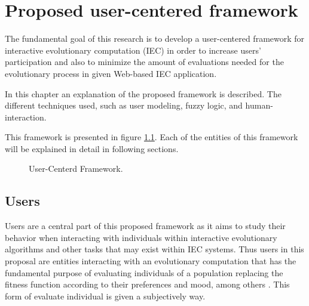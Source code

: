 \chapter{Proposed user-centered framework}

The fundamental goal of this research is to develop a user-centered framework
for interactive evolutionary computation (IEC) in order to increase users’
participation and also to minimize the amount of evaluations needed for the
evolutionary process in given Web-based IEC application.

In this chapter an explanation of the proposed framework is described. The
different techniques used, such as user modeling, fuzzy logic, and human-
interaction.

This framework is presented in figure \ref{fig:uc_framework}. Each of the
entities of this framework will be explained in detail in following sections.

\begin{figure}
	\captionsetup{justification=centering,margin=2cm}
	\centering
	\setlength\fboxsep{0pt}
	\setlength\fboxrule{0.7pt}
	\caption{User-Centerd Framework.}
	\label{fig:uc_framework}
\end{figure}

\section{Users}

Users are a central part of this proposed framework as it aims to study their
behavior when interacting with individuals within interactive evolutionary
algorithms and other tasks that may exist within IEC systems. Thus users in this
proposal are entities interacting with an evolutionary computation that has the
fundamental purpose of evaluating individuals of a population replacing the
fitness function according to their preferences and mood, among others
\cite{takagi1998interactive}. This form of evaluate individual is given a
subjectively way.

